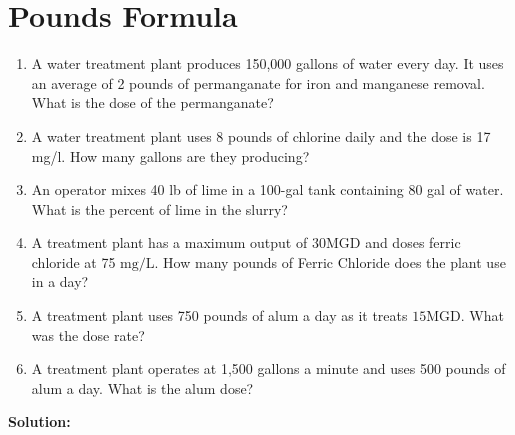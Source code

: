 \documentclass{article}
\begin{document}
\section{Pounds Formula}
\begin{enumerate}

\item A water treatment plant produces 150,000 gallons of water every day. It uses an
average of 2 pounds of permanganate for iron and manganese removal. What is the dose of the
permanganate? 

\item A water treatment plant uses 8 pounds of chlorine daily and the dose is 17 mg/l. How
many gallons are they producing?

\item An operator mixes 40 lb of lime in a 100-gal tank containing 80 gal of water. What is the percent of lime in the slurry?

\item A treatment plant has a maximum output of $30 \mathrm{MGD}$ and doses ferric chloride at 75 $\mathrm{mg} / \mathrm{L}$. How many pounds of Ferric Chloride does the plant use in a day?\\

\item  A treatment plant uses 750 pounds of alum a day as it treats $15 \mathrm{MGD}$. What was the dose rate?\\


\item  A treatment plant operates at 1,500 gallons a minute and uses 500 pounds of alum a day. What is the alum dose?\\

\end{enumerate}
\newpage
\textbf{Solution:}
\end{document}
